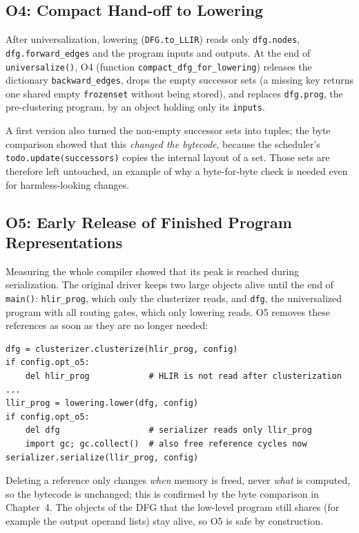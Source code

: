 \documentclass[12pt,a4paper,oneside]{report}
\newcommand{\code}[1]{\texttt{#1}}
\begin{document}
\subsection{O4: Compact Hand-off to Lowering}
\label{sec:o4}
After universalization, lowering (\code{DFG.to\_LLIR}) reads only \code{dfg.nodes},
\code{dfg.forward\_edges} and the program inputs and outputs. At the end of \code{universalize()},
O4 (function \code{compact\_dfg\_for\_lowering}) releases the dictionary \code{backward\_edges},
drops the empty successor
sets (a missing key returns one shared empty \code{frozenset} without being stored), and replaces
\code{dfg.prog}, the pre-clustering program, by an object holding only its \code{inputs}.

A first version also turned the non-empty successor sets into tuples; the byte comparison showed
that this \emph{changed the bytecode}, because the scheduler's \code{todo.update(successors)}
copies the internal layout of a set. Those sets are therefore left untouched, an example of why a
byte-for-byte check is needed even for harmless-looking changes.

\subsection{O5: Early Release of Finished Program Representations}
Measuring the whole compiler showed that its peak is reached during serialization. The original
driver keeps two large objects alive until the end of \code{main()}: \code{hlir\_prog}, which only
the clusterizer reads, and \code{dfg}, the universalized program with all routing gates, which only
lowering reads. O5 removes these references as soon as they are no longer needed:
\begin{lstlisting}
dfg = clusterizer.clusterize(hlir_prog, config)
if config.opt_o5:
    del hlir_prog            # HLIR is not read after clusterization
...
llir_prog = lowering.lower(dfg, config)
if config.opt_o5:
    del dfg                  # serializer reads only llir_prog
    import gc; gc.collect()  # also free reference cycles now
serializer.serialize(llir_prog, config)
\end{lstlisting}
Deleting a reference only changes \emph{when} memory is freed, never \emph{what} is computed, so
the bytecode is unchanged; this is confirmed by the byte comparison in Chapter~4. The objects of
the DFG that the low-level program still shares (for example the output operand lists) stay alive,
so O5 is safe by construction.
\end{document}
